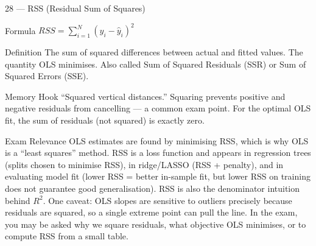 \documentclass[aspectratio=169,8pt]{beamer}
\begin{document}
	\begin{frame}{28 --- RSS (Residual Sum of Squares)}
		\begin{block}{Formula}
			$RSS = \sum_{i=1}^{N}(y_i - \hat{y}_i)^2$
		\end{block}
		\begin{block}{Definition}
			The sum of squared differences between actual and fitted values. The quantity OLS minimises. Also called Sum of Squared Residuals (SSR) or Sum of Squared Errors (SSE).
		\end{block}
		\begin{block}{Memory Hook}
			``Squared vertical distances.'' Squaring prevents positive and negative residuals from cancelling --- a common exam point. For the optimal OLS fit, the sum of residuals (not squared) is exactly zero.
		\end{block}
		\begin{block}{Exam Relevance}
			OLS estimates are found by minimising RSS, which is why OLS is a ``least squares'' method. RSS is a loss function and appears in regression trees (splits chosen to minimise RSS), in ridge/LASSO (RSS + penalty), and in evaluating model fit (lower RSS = better in-sample fit, but lower RSS on training does not guarantee good generalisation). RSS is also the denominator intuition behind $R^2$. One caveat: OLS slopes are sensitive to outliers precisely because residuals are squared, so a single extreme point can pull the line. In the exam, you may be asked why we square residuals, what objective OLS minimises, or to compute RSS from a small table.
		\end{block}
	\end{frame}
	
\end{document}
